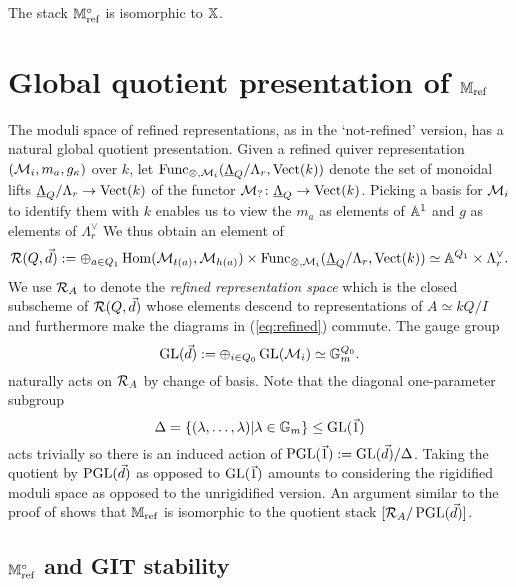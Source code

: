 \documentclass[12pt]{amsart}
\begin{document}
\begin{corollary}\label{cor:mref}   
The stack $\mathbb{M}_\textup{ref}^\circ$ is isomorphic to $\mathbb{X}$.
\end{corollary}

\section{Global quotient presentation of $\mathbb{M}_\textup{ref}$}\label{sc:GIT}

The moduli space of refined representations, as in the `not-refined' version, has a natural global quotient presentation.
Given a refined quiver representation $(\mathcal{M}_i, m_a, g_\kappa)$ over $k$, let $\text{Func}_{\otimes, \mathcal{M}_i}(\underline{\Lambda}_{Q}/\Lambda_r, \operatorname{Vect}(k))$ denote the set of monoidal lifts $\underline{\Lambda}_{Q}/\Lambda_r\rightarrow \operatorname{Vect}(k)$ of the functor $\mathcal{M}_? \colon \underline{\Lambda}_{Q} \rightarrow \operatorname{Vect}(k)$.
Picking a basis for $\mathcal{M}_i$ to identify them with $k$ enables us to view the $m_a$ as elements of $\mathbb{A}^1$ and $g$ as elements of $\Lambda_r^{\vee}$
We thus obtain an element of
\begin{equation*}
\mathcal{R}(Q, \vec{d}) := \oplus_{a \in Q_1} \operatorname{Hom}(\mathcal{M}_{t(a)}, \mathcal{M}_{h(a)}) \times \text{Func}_{\otimes, \mathcal{M}_i}(\underline{\Lambda}_{Q}/\Lambda_r, \operatorname{Vect}(k))\simeq \mathbb{A}^{Q_1} \times \Lambda_r^{\vee}. \end{equation*}
We use $\mathcal{R}_A$ to denote the {\em refined representation space} which is the closed subscheme of $\mathcal{R}(Q, \vec{d})$ whose elements descend to representations of $A \simeq kQ/I$ and furthermore make the diagrams in (\ref{eq:refined}) commute.
The gauge group
\begin{equation*}
\operatorname{GL}(\vec{d}) := \oplus_{i \in Q_0} \operatorname{GL}(\mathcal{M}_i) \simeq \mathbb{G}_m^{Q_0}.
\end{equation*}
naturally acts on $\mathcal{R}_A$ by change of basis.
Note that the diagonal one-parameter subgroup 
$$\Delta = \{(\lambda, \ldots,\lambda) | \lambda \in \mathbb{G}_m\} \leq \operatorname{GL}(\vec{1})$$ 
acts trivially so there is an induced action of $\operatorname{PGL}(\vec{1}) := \operatorname{GL}(\vec{d}) / \Delta$.
Taking the quotient by $\operatorname{PGL}(\vec{d})$ as opposed to $\operatorname{GL}(\vec{1})$ amounts to considering the rigidified moduli space as opposed to the unrigidified version. 
An argument similar to the proof of \cite[Proposition 3.9]{Abd} shows that $\mathbb{M}_{\text{ref}}$ is isomorphic to the quotient stack $[\mathcal{R}_A/ \operatorname{PGL}(\vec{d})]$.

\subsection{$\mathbb{M}_{\text{ref}}^\circ$ and GIT stability}
\end{document}
